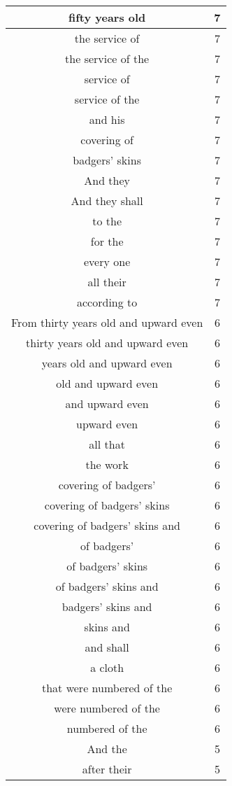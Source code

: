 \begin{center}
\begin{longtable}{|c|c|}
fifty years old & 7\\ \hline 
the service of & 7\\ \hline 
the service of the & 7\\ \hline 
service of & 7\\ \hline 
service of the & 7\\ \hline 
and his & 7\\ \hline 
covering of & 7\\ \hline 
badgers' skins & 7\\ \hline 
And they & 7\\ \hline 
And they shall & 7\\ \hline 
to the & 7\\ \hline 
for the & 7\\ \hline 
every one & 7\\ \hline 
all their & 7\\ \hline 
according to & 7\\ \hline 
From thirty years old and upward even & 6\\ \hline 
thirty years old and upward even & 6\\ \hline 
years old and upward even & 6\\ \hline 
old and upward even & 6\\ \hline 
and upward even & 6\\ \hline 
upward even & 6\\ \hline 
all that & 6\\ \hline 
the work & 6\\ \hline 
covering of badgers' & 6\\ \hline 
covering of badgers' skins & 6\\ \hline 
covering of badgers' skins and & 6\\ \hline 
of badgers' & 6\\ \hline 
of badgers' skins & 6\\ \hline 
of badgers' skins and & 6\\ \hline 
badgers' skins and & 6\\ \hline 
skins and & 6\\ \hline 
and shall & 6\\ \hline 
a cloth & 6\\ \hline 
that were numbered of the & 6\\ \hline 
were numbered of the & 6\\ \hline 
numbered of the & 6\\ \hline 
And the & 5\\ \hline 
after their & 5\\ \hline 

\end{longtable}
\end{center}
